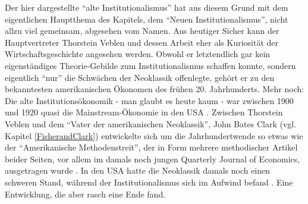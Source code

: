 Der hier dargestellte "`alte Institutionalismus"' hat aus diesem Grund mit dem eigentlichen Hauptthema des Kapitels, dem "`Neuen Institutionalismus"', nicht allzu viel gemeinsam, abgesehen vom Namen. Aus heutiger Sicher kann der Hauptvertreter Thorstein Veblen und dessen Arbeit eher als Kuriosität der Wirtschaftsgeschichte angesehen werden. Obwohl er letztendlich gar kein eigenständiges Theorie-Gebilde zum Institutionalismus schaffen konnte, sondern eigentlich "`nur"' die Schwächen der Neoklassik offenlegte, gehört er zu den bekanntesten amerikanischen Ökonomen des frühen 20. Jahrhunderts. Mehr noch: Die alte Institutionsökonomik - man glaubt es heute kaum - war zwischen 1900 und 1920 quasi die Mainstream-Ökonomie in den USA \parencite[S. 97]{Persky2000} \parencite[S. 166]{Hodgson1998}. Zwischen Thorstein Veblen und dem "`Vater der amerikanischen Neoklassik"', John Bates Clark (vgl. Kapitel \ref{FisherandClark}) entwickelte sich um die Jahrhundertwende so etwas wie der "`Amerikanische Methodenstreit"', der in Form mehrere methodischer Artikel beider Seiten, vor allem im damals noch jungen Quarterly Journal of Economics, ausgetragen wurde \parencite[S. 100]{Persky2000}. In den USA hatte die Neoklassik damals noch einen schweren Stand, während der Institutionalismus sich im Aufwind befand \parencite[S. 100]{Persky2000}. Eine Entwicklung, die aber rasch eine Ende fand. 

